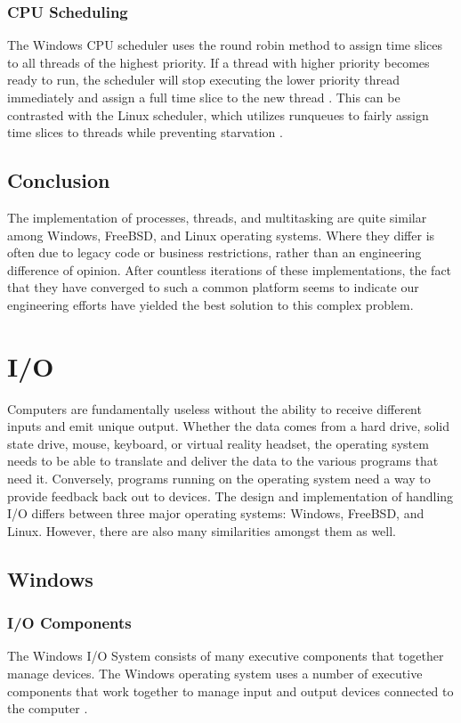 \documentclass[letterpaper,draftclsnofoot,10pt,onecolumn,titlepage]{IEEEtran}\usepackage[margin=0.75in]{geometry}
\begin{document}
        \subsubsection{CPU Scheduling}
        The Windows CPU scheduler uses the round robin method to assign time slices to all threads of the highest 
        priority. If a thread with higher priority becomes ready to run, the scheduler will stop executing the lower
        priority thread immediately and assign a full time slice to the new thread \cite{windowsprocesses}. This can 
        be contrasted with the Linux scheduler, which utilizes runqueues to fairly assign time slices to threads 
        while preventing starvation \cite{linuxscheduler}.
    
    \subsection{Conclusion}
    The implementation of processes, threads, and multitasking are quite similar among Windows, FreeBSD, and Linux 
    operating systems. Where they differ is often due to legacy code or business restrictions, rather than an 
    engineering difference of opinion. After countless iterations of these implementations, the fact that they 
    have converged to such a common platform seems to indicate our engineering efforts have yielded the best 
    solution to this complex problem.



\section{I/O}
Computers are fundamentally useless without the ability to receive different inputs and emit unique output.
Whether the data comes from a hard drive, solid state drive, mouse, keyboard, or virtual reality headset,
the operating system needs to be able to translate and deliver the data to the various programs that need
it. Conversely, programs running on the operating system need a way to provide feedback back out to 
devices. The design and implementation of handling I/O differs between three major operating systems: Windows,
FreeBSD, and Linux. However, there are also many similarities amongst them as well.

    \subsection{Windows}
        \subsubsection{I/O Components}
        The Windows I/O System consists of many executive components that together manage devices.
        The Windows operating system uses a number of executive components that work together to manage input and 
        output devices connected to the computer \cite{windows}.
\end{document}
